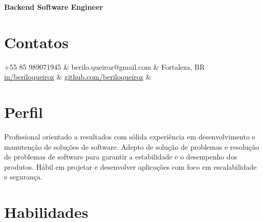 \documentclass[11pt,a4paper,sans]{moderncv}
\begin{document}
\makecvtitle
\vspace*{-16mm}
\begin{center}\textbf{ Backend Software Engineer}\end{center}

\section{Contatos}{
  \begin{center}
	  \faMobile\enspace +55 85 989071945                                                                  & \enspace berilo.queiroz@gmail.com & \enspace\faHome\enspace Fortaleza, BR \\
	  \faLinkedin\enspace \color{blue} \href{https://www.linkedin.com/in/beriloqueiroz}{in/beriloqueiroz} &
	  \faGithub\enspace \color{blue} \href{https://github.com/beriloqueiroz}{github.com/beriloqueiroz}    & \enspace
  \end{center}
 }

\section{Perfil}
 {
  Profissional orientado a resultados com sólida experiência em desenvolvimento e manutenção de soluções de software. Adepto de solução de problemas e resolução de problemas de software para garantir a estabilidade e o desempenho dos produtos.
  Hábil em projetar e desenvolver aplicações com foco em escalabilidade e segurança.
 }

\section{Habilidades}
 {
       
    \\
  \\
     \\
  \\
      \\
  \\
      \\
  \\
   \\
  \\
    \\
  \\
      \\
  \\
 }
\end{document}
